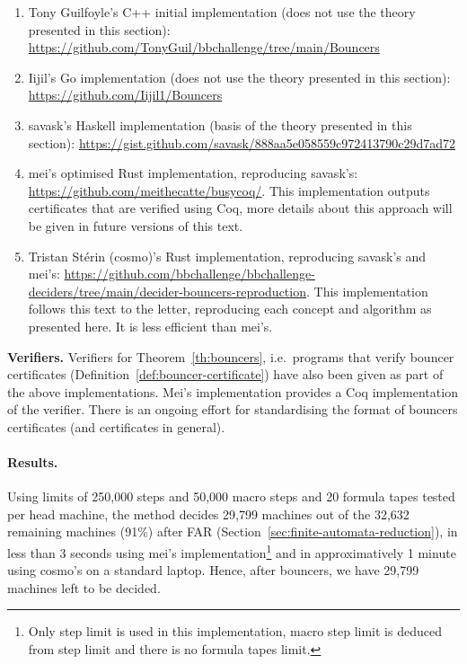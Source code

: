 \begin{enumerate}
    \item Tony Guilfoyle's C++ initial implementation (does not use the theory presented in this section): \url{https://github.com/TonyGuil/bbchallenge/tree/main/Bouncers}
    \item Iijil's Go implementation (does not use the theory presented in this section): \url{https://github.com/Iijil1/Bouncers}
    \item savask's Haskell implementation (basis of the theory presented in this section): \url{https://gist.github.com/savask/888aa5e058559c972413790c29d7ad72}
    \item mei's optimised Rust implementation, reproducing savask's: \url{https://github.com/meithecatte/busycoq/}. This implementation outputs certificates that are verified using Coq, more details about this approach will be given in future versions of this text.
    \item Tristan Stérin (cosmo)'s Rust implementation, reproducing savask's and mei's: \url{https://github.com/bbchallenge/bbchallenge-deciders/tree/main/decider-bouncers-reproduction}. This implementation follows this text to the letter, reproducing each concept and algorithm as presented here. It is less efficient than mei's.


\end{enumerate}


\textbf{Verifiers.} Verifiers for Theorem~\ref{th:bouncers}, i.e.\ programs that verify bouncer certificates (Definition~\ref{def:bouncer-certificate}) have also been given as part of the above implementations. Mei's implementation provides a Coq implementation of the verifier. There is an ongoing effort for standardising the format of bouncers certificates (and certificates in general).

\paragraph*{Results.} Using limits of 250,000 steps and 50,000 macro steps and 20 formula tapes tested per head machine, the method decides 29,799 machines out of the 32,632 remaining machines (91\%) after FAR (Section~\ref{sec:finite-automata-reduction}), in less than 3 seconds using mei's implementation\footnote{Only step limit is used in this implementation, macro step limit is deduced from step limit and there is no formula tapes limit.} and in approximatively 1 minute using cosmo's on a standard laptop. Hence, after bouncers, we have 29,799 machines left to be decided.

